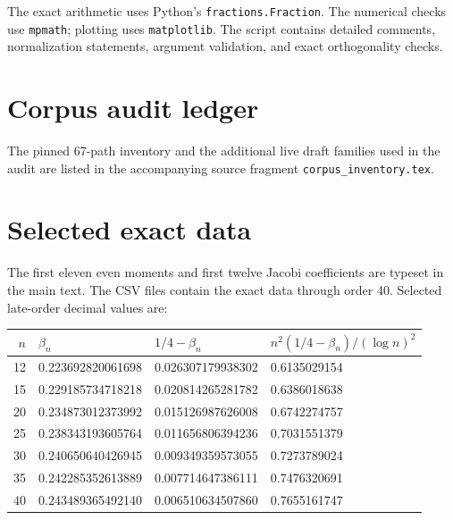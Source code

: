 \documentclass[11pt]{article}
\theoremstyle{definition}
\theoremstyle{remark}
\begin{document}
The exact arithmetic uses Python's \texttt{fractions.Fraction}.  The numerical checks use
\texttt{mpmath}; plotting uses \texttt{matplotlib}.  The script contains detailed comments,
normalization statements, argument validation, and exact orthogonality checks.

\section{Corpus audit ledger}\label{p3:app:corpus}

The pinned 67-path inventory and the additional live draft families used in the audit are
listed in the accompanying source fragment \texttt{corpus\_inventory.tex}.



\section{Selected exact data}\label{p3:app:data}

The first eleven even moments and first twelve Jacobi coefficients are typeset in the main
text.  The CSV files contain the exact data through order 40.  Selected late-order decimal
values are:
\begin{center}
\begin{tabular}{rlll}
\toprule
\(n\) & \(\beta_n\) & \(1/4-\beta_n\) &
\(n^2(1/4-\beta_n)/(\log n)^2\) \\
\midrule
12 & 0.223692820061698 & 0.026307179938302 & 0.6135029154 \\
15 & 0.229185734718218 & 0.020814265281782 & 0.6386018638 \\
20 & 0.234873012373992 & 0.015126987626008 & 0.6742274757 \\
25 & 0.238343193605764 & 0.011656806394236 & 0.7031551379 \\
30 & 0.240650640426945 & 0.009349359573055 & 0.7273789024 \\
35 & 0.242285352613889 & 0.007714647386111 & 0.7476320691 \\
40 & 0.243489365492140 & 0.006510634507860 & 0.7655161747 \\
\bottomrule
\end{tabular}
\end{center}
\end{document}
